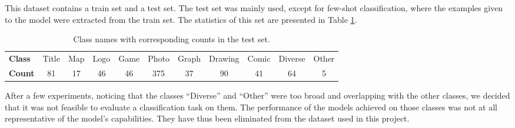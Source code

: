 This dataset %
contains a train set and a test set. The test set was mainly used, except for few-shot classification, where the examples given to the model were extracted from the train set. The statistics of this set are presented in Table \ref{tab:test-set}.

\begin{table}[h]
    \centering
    \begin{tabular}{lcccccccccc}
        \toprule
        \textbf{Class} & Title & Map & Logo & Game & Photo & Graph & Drawing & Comic & Diverse & Other \\
        \textbf{Count} & 81 & 17 & 46 & 46 & 375 & 37 & 90 & 41 & 64 & 5 \\
        \bottomrule
    \end{tabular}
    \caption{Class names with corresponding counts in the test set.}
    \label{tab:test-set}
\end{table}

After a few experiments, noticing that the classes “Diverse” and “Other” were too broad and overlapping with the other classes, we decided that it was not feasible to evaluate a classification task on them. The performance of the models achieved on those classes was not at all representative of the model's capabilities. They have thus been eliminated from the dataset used in this project.

